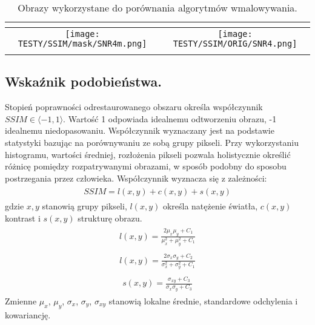 \documentclass[12pt, twoside, openany]{report}
\theoremstyle{definition}
\begin{document}
\begin{longtable}[h!]{|c|c|}
    \multicolumn{2}{|c|}{
		\SNRIV
    } \\ \hline 
    \begin{minipage}{0.5\textwidth}
    \vspace{0.5cm}
    \centering
    \texttt{[image: TESTY/SSIM/mask/SNR4m.png]}
    \vspace{0.5cm}
    \end{minipage}
	&
    \begin{minipage}{0.5\textwidth}
    \vspace{0.5cm}
    \centering
    \texttt{[image: TESTY/SSIM/ORIG/SNR4.png]}
    \vspace{0.5cm}
    \end{minipage}\\ \hline
    \caption{Obrazy wykorzystane do porównania algorytmów wmalowywania.}
	\label{COMPAREIMAGES}
\end{longtable}
\subsection{Wskaźnik podobieństwa.}
Stopień poprawności odrestaurowanego obszaru określa współczynnik $SSIM \in \langle -1,1 \rangle$. Wartość 1 odpowiada idealnemu odtworzeniu obrazu, -1 idealnemu niedopasowaniu. Współczynnik wyznaczany jest na podstawie statystyki bazując na porównywaniu ze sobą grupy pikseli. Przy wykorzystaniu histogramu, wartości średniej, rozłożenia pikseli pozwala holistycznie określić różnicę pomiędzy rozpatrywanymi obrazami, w sposób podobny do sposobu  postrzegania przez człowieka. Współczynnik wyznacza się z zależności:
\begin{align}
\begin{aligned}
SSIM = l(x,y) + c(x,y) + s(x,y)
\end{aligned}
\end{align}
gdzie $x,y$ stanowią grupy pikseli, $l(x,y)$ określa natężenie światła, $c(x,y)$ kontrast i $s(x,y)$ strukturę obrazu.
\begin{align}
\begin{aligned}
l(x,y) = \frac{2 \mu_x \mu_y + C_1}{\mu^2_x + \mu^2_y + C_1}
\end{aligned}
\end{align}
\begin{align}
\begin{aligned}
l(x,y) = \frac{2 \sigma_x \sigma_y + C_2}{\sigma^2_x + \sigma^2_y + C_1}
\end{aligned}
\end{align}
\begin{align}
\begin{aligned}
s(x,y) = \frac{\sigma_{xy} + C_3}{\sigma_{x}\sigma_{y}+C_3}
\end{aligned}
\end{align}
Zmienne $\mu_x$, $\mu_y$, $\sigma_{x}$, $\sigma_{y}$, $\sigma_{xy}$ stanowią lokalne średnie, standardowe odchylenia i kowariancję.
\end{document}
